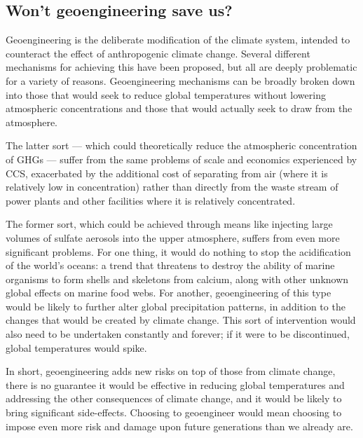 	\subsection{Won't geoengineering save us?}
	\label{GeoSaves}
	
	
Geoengineering is the deliberate modification of the climate system, intended to counteract the effect of anthropogenic climate change.
Several different mechanisms for achieving this have been proposed, but all are deeply problematic for a variety of reasons.
Geoengineering mechanisms can be broadly broken down into those that would seek to reduce global temperatures without lowering atmospheric  concentrations and those that would actually seek to draw  from the atmosphere.



The latter sort --- which could theoretically reduce the atmospheric concentration of GHGs --- suffer from the same problems of scale and economics experienced by CCS, exacerbated by the additional cost of separating  from air (where it is relatively low in concentration) rather than directly from the waste stream of power plants and other facilities where it is relatively concentrated.  



The former sort, which could be achieved through means like injecting large volumes of sulfate aerosols into the upper atmosphere, suffers from even more significant problems.
For one thing, it would do nothing to stop the acidification of the world's oceans: a trend that threatens to destroy the ability of marine organisms to form shells and skeletons from calcium, along with other unknown global effects on marine food webs.
For another, geoengineering of this type would be likely to further alter global precipitation patterns, in addition to the changes that would be created by climate change.
This sort of intervention would also need to be undertaken constantly and forever; if it were to be discontinued, global temperatures would spike.



In short, geoengineering adds new risks on top of those from climate change, there is no guarantee it would be effective in reducing global temperatures and addressing the other consequences of climate change, and it would be likely to bring significant side-effects.
Choosing to geoengineer would mean choosing to impose even more risk and damage upon future generations than we already are.



